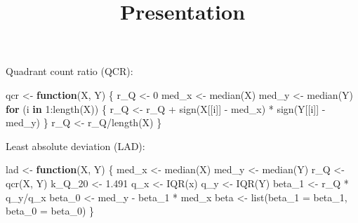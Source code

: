 \documentclass[
]{article}
\title{Presentation}
\author{}
\date{\vspace{-2.5em}}
\newenvironment{Shaded}{\begin{snugshade}}{\end{snugshade}}
\newcommand{\AttributeTok}[1]{\textcolor[rgb]{0.77,0.63,0.00}{#1}}
\newcommand{\ControlFlowTok}[1]{\textcolor[rgb]{0.13,0.29,0.53}{\textbf{#1}}}
\newcommand{\DecValTok}[1]{\textcolor[rgb]{0.00,0.00,0.81}{#1}}
\newcommand{\FloatTok}[1]{\textcolor[rgb]{0.00,0.00,0.81}{#1}}
\newcommand{\FunctionTok}[1]{\textcolor[rgb]{0.00,0.00,0.00}{#1}}
\newcommand{\NormalTok}[1]{#1}
\newcommand{\OtherTok}[1]{\textcolor[rgb]{0.56,0.35,0.01}{#1}}
\newcommand{\SpecialCharTok}[1]{\textcolor[rgb]{0.00,0.00,0.00}{#1}}
\begin{document}
\maketitle

Quadrant count ratio (QCR):

\begin{Shaded}
\begin{Highlighting}[]
\NormalTok{qcr }\OtherTok{\textless{}{-}} \ControlFlowTok{function}\NormalTok{(X, Y) \{}
\NormalTok{    r\_Q }\OtherTok{\textless{}{-}} \DecValTok{0}
\NormalTok{    med\_x }\OtherTok{\textless{}{-}} \FunctionTok{median}\NormalTok{(X)}
\NormalTok{    med\_y }\OtherTok{\textless{}{-}} \FunctionTok{median}\NormalTok{(Y)}
    \ControlFlowTok{for}\NormalTok{ (i }\ControlFlowTok{in} \DecValTok{1}\SpecialCharTok{:}\FunctionTok{length}\NormalTok{(X)) \{}
\NormalTok{        r\_Q }\OtherTok{\textless{}{-}}\NormalTok{ r\_Q }\SpecialCharTok{+} \FunctionTok{sign}\NormalTok{(X[[i]] }\SpecialCharTok{{-}}\NormalTok{ med\_x) }\SpecialCharTok{*} \FunctionTok{sign}\NormalTok{(Y[[i]] }\SpecialCharTok{{-}}\NormalTok{ med\_y)}
\NormalTok{    \}}
\NormalTok{    r\_Q }\OtherTok{\textless{}{-}}\NormalTok{ r\_Q}\SpecialCharTok{/}\FunctionTok{length}\NormalTok{(X)}
\NormalTok{\}}
\end{Highlighting}
\end{Shaded}

Least absolute deviation (LAD):

\begin{Shaded}
\begin{Highlighting}[]
\NormalTok{lad }\OtherTok{\textless{}{-}} \ControlFlowTok{function}\NormalTok{(X, Y) \{}
\NormalTok{    med\_x }\OtherTok{\textless{}{-}} \FunctionTok{median}\NormalTok{(X)}
\NormalTok{    med\_y }\OtherTok{\textless{}{-}} \FunctionTok{median}\NormalTok{(Y)}
\NormalTok{    r\_Q }\OtherTok{\textless{}{-}} \FunctionTok{qcr}\NormalTok{(X, Y)}
\NormalTok{    k\_Q\_20 }\OtherTok{\textless{}{-}} \FloatTok{1.491}
\NormalTok{    q\_x }\OtherTok{\textless{}{-}} \FunctionTok{IQR}\NormalTok{(x)}
\NormalTok{    q\_y }\OtherTok{\textless{}{-}} \FunctionTok{IQR}\NormalTok{(Y)}
\NormalTok{    beta\_1 }\OtherTok{\textless{}{-}}\NormalTok{ r\_Q }\SpecialCharTok{*}\NormalTok{ q\_y}\SpecialCharTok{/}\NormalTok{q\_x}
\NormalTok{    beta\_0 }\OtherTok{\textless{}{-}}\NormalTok{ med\_y }\SpecialCharTok{{-}}\NormalTok{ beta\_1 }\SpecialCharTok{*}\NormalTok{ med\_x}
\NormalTok{    beta }\OtherTok{\textless{}{-}} \FunctionTok{list}\NormalTok{(}\AttributeTok{beta\_1 =}\NormalTok{ beta\_1, }\AttributeTok{beta\_0 =}\NormalTok{ beta\_0)}
\NormalTok{\}}
\end{Highlighting}
\end{Shaded}
\end{document}
